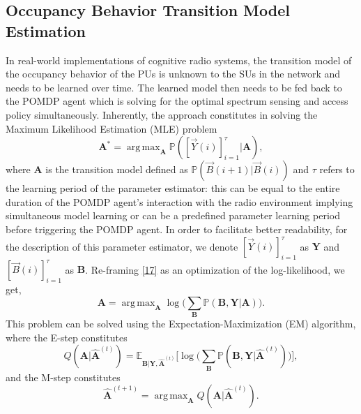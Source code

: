 \documentclass[10pt,twocolumn]{IEEEtran}
\DeclareMathOperator*{\argmax}{arg\,max}
\begin{document}
\subsection{Occupancy Behavior Transition Model Estimation}
In real-world implementations of cognitive radio systems, the transition model of the occupancy behavior of the PUs is unknown to the SUs in the network and needs to be learned over time. The learned model then needs to be fed back to the POMDP agent which is solving for the optimal spectrum sensing and access policy simultaneously. Inherently, the approach constitutes in solving the Maximum Likelihood Estimation (MLE) problem
\begin{equation}\label{17}
    \mathbf{A}^{*} = \argmax_{\mathbf{A}} \mathbb{P}([\vec{Y}(i)]_{i=1}^{\tau}|\mathbf{A}),
\end{equation}
where $\mathbf{A}$ is the transition model defined as $\mathbb{P}(\vec{B}(i+1)|\vec{B}(i))$ and $\tau$ refers to the learning period of the parameter estimator: this can be equal to the entire duration of the POMDP agent's interaction with the radio environment implying simultaneous model learning or can be a predefined parameter learning period before triggering the POMDP agent. In order to facilitate better readability, for the description of this parameter estimator, we denote $[\vec{Y}(i)]_{i=1}^{\tau}$ as $\mathbf{Y}$ and $[\vec{B}(i)]_{i=1}^{\tau}$ as $\mathbf{B}$. Re-framing \eqref{17} as an optimization of the log-likelihood, we get,
\begin{equation}\label{18}
    \mathbf{A} = \argmax_{\mathbf{A}} \log\Big(\sum_{\mathbf{B}} \mathbb{P}(\mathbf{B}, \mathbf{Y}| \mathbf{A})\Big).
\end{equation}
This problem can be solved using the Expectation-Maximization (EM) algorithm, where the E-step constitutes
\begin{equation}
    Q(\mathbf{A}|\hat{\mathbf{A}}^{(t)}) = \mathbb{E}_{\mathbf{B}|\mathbf{Y}, \hat{\mathbf{A}}^{(t)}} \Big[ \log \Big(\sum_{\mathbf{B}} \mathbb{P}(\mathbf{B}, \mathbf{Y}|\hat{\mathbf{A}}^{(t)}) \Big) \Big],
\end{equation}
and the M-step constitutes
\begin{equation}
    \hat{\mathbf{A}}^{(t+1)} = \argmax_{\mathbf{A}} Q(\mathbf{A}|\hat{\mathbf{A}}^{(t)}).
\end{equation}
\end{document}
